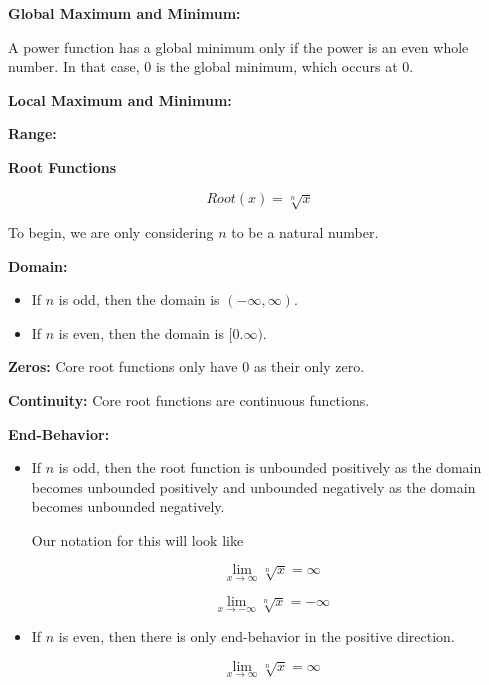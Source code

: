 \documentclass{ximera}
\begin{document}
\begin{explanation}
\textbf{Global Maximum and Minimum:} 

A power function has a global minimum only if the power is an even whole number. In that case, $0$ is the global minimum, which occurs at $0$.

\textbf{Local Maximum and Minimum:} 

\textbf{Range:} 

\end{explanation}










\begin{explanation} \textbf{\textcolor{red!75!green}{Root Functions}} 


\[ Root(x) = \sqrt[n]{x}  \]

To begin, we are only considering $n$ to be a natural number.


\textbf{Domain:} 


\begin{itemize}
\item If $n$ is odd, then the domain is $(-\infty, \infty)$.
\item If $n$ is even, then the domain is $[0. \infty)$.
\end{itemize}


\textbf{Zeros:} Core root functions only have $0$ as their only zero.

\textbf{Continuity:}  Core root functions are continuous functions.

\textbf{End-Behavior:} 


\begin{itemize}
\item If $n$ is odd, then the root function is unbounded positively as the domain becomes unbounded positively and unbounded negatively as the domain becomes unbounded negatively.

Our notation for this will look like 


\[
\lim\limits_{x \to \infty} \sqrt[n]{x} = \infty
\]


\[
\lim\limits_{x \to -\infty} \sqrt[n]{x} = -\infty
\]


\item If $n$ is even, then there is only end-behavior in the positive direction.

\[
\lim\limits_{x \to \infty} \sqrt[n]{x} = \infty
\]



\end{itemize}



\end{explanation}
\end{document}
